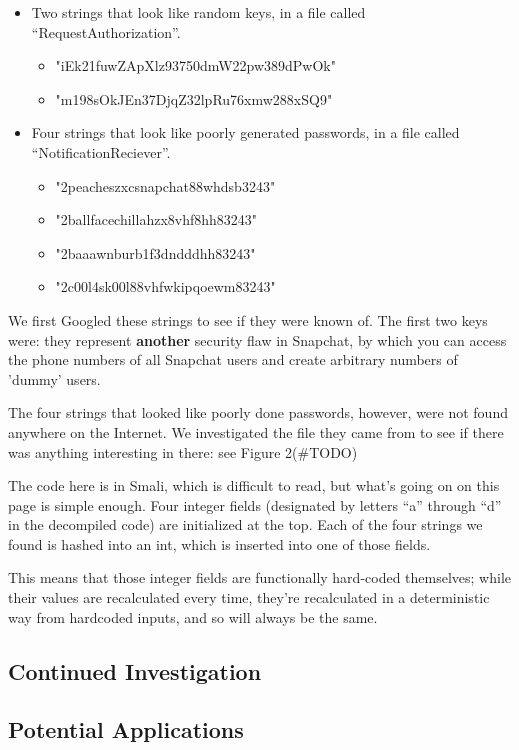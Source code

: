 \documentclass[11pt]{article}
\numberwithin{theorem}{subsection}
\begin{document}
\begin{itemize}
\item Two strings that look like random keys, in a file called ``RequestAuthorization''. 
\begin{itemize}
\item "iEk21fuwZApXlz93750dmW22pw389dPwOk"
\item "m198sOkJEn37DjqZ32lpRu76xmw288xSQ9"
\end{itemize}
\item Four strings that look like poorly generated passwords, in a file called ``NotificationReciever''.
\begin{itemize}
\item "2peacheszxcsnapchat88whdsb3243"
\item "2ballfacechillahzx8vhf8hh83243"
\item "2baaawnburb1f3dndddhh83243"
\item "2c00l4sk00l88vhfwkipqoewm83243"
\end{itemize}
\end{itemize}

We first Googled these strings to see if they were known of.  The first two keys were: they represent \textbf{another} security
flaw in Snapchat, by which you can access the phone numbers of all Snapchat users and create arbitrary numbers of 'dummy' users.\cite{2}

The four strings that looked like poorly done passwords, however, were not found anywhere on the Internet.  We investigated the file
they came from to see if there was anything interesting in there: see Figure 2(\#TODO)

The code here is in Smali, which is difficult to read, but what's going on on this page is simple enough.  Four integer fields (designated by
letters ``a'' through ``d'' in the decompiled code) are initialized at the top.  Each of the four strings we found is hashed into an int, which 
is inserted into one of those fields.

This means that those integer fields are functionally hard-coded themselves; while their values are recalculated every time, they're recalculated in a
deterministic way from hardcoded inputs, and so will always be the same.

\subsection{Continued Investigation}

\subsection{Potential Applications}
\end{document}
